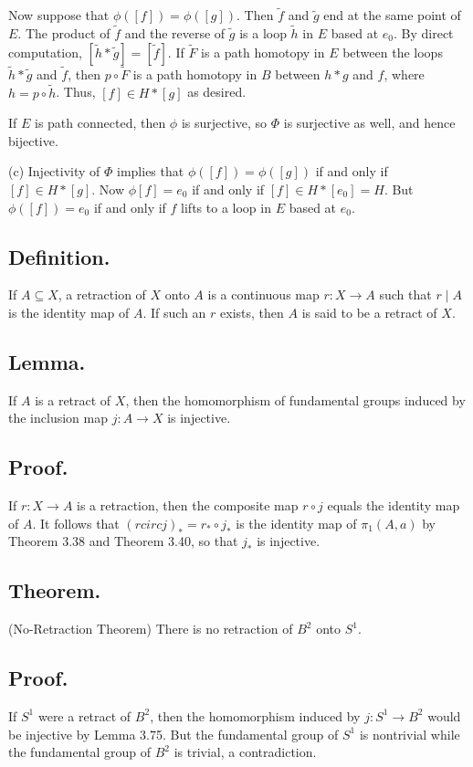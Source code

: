 \documentclass[titlepage]{article}
\begin{document}
Now suppose that $\phi([f]) = \phi([g])$. Then $\tilde{f}$ and $\tilde{g}$ end at the same point of $E$. The product of $\tilde{f}$ and the reverse of $\tilde{g}$ is a loop $\tilde{h}$ in $E$ based at $e_{0}$. By direct computation, $[\tilde{h} * \tilde{g}] = [\tilde{f}]$. If $\tilde{F}$ is a path homotopy in $E$ between the loops $\tilde{h} * \tilde{g}$ and $\tilde{f}$, then $p \circ \tilde{F}$ is a path homotopy in $B$ between $h * g$ and $f$, where $h = p \circ \tilde{h}$. Thus, $[f] \in H * [g]$ as desired.

If $E$ is path connected, then $\phi$ is surjective, so $\Phi$ is surjective as well, and hence bijective.

(c) Injectivity of $\Phi$ implies that $\phi([f]) = \phi([g])$ if and only if $[f] \in H * [g]$. Now $\phi[f] = e_{0}$ if and only if $[f] \in H * [e_{0}] = H$. But $\phi([f]) = e_{0}$ if and only if $f$ lifts to a loop in $E$ based at $e_{0}$.

\subsection{Definition.} If $A \subseteq X$, a retraction of $X$ onto $A$ is a continuous map $r: X \to A$ such that $r \mid A$ is the identity map of $A$. If such an $r$ exists, then $A$ is said to be a retract of $X$.

\subsection{Lemma.} If $A$ is a retract of $X$, then the homomorphism of fundamental groups induced by the inclusion map $j: A \to X$ is injective.

\subsection{Proof.} If $r: X \to A$ is a retraction, then the composite map $r \circ j$ equals the identity map of $A$. It follows that $(r circ j)_{*} = r_{*} \circ j_{*}$ is the identity map of $\pi_{1}(A, a)$ by Theorem 3.38 and Theorem 3.40, so that $j_{*}$ is injective.

\subsection{Theorem.} (No-Retraction Theorem) There is no retraction of $B^{2}$ onto $S^{1}$.

\subsection{Proof.} If $S^{1}$ were a retract of $B^{2}$, then the homomorphism induced by $j: S^{1} \to B^{2}$ would be injective by Lemma 3.75. But the fundamental group of $S^{1}$ is nontrivial while the fundamental group of $B^{2}$ is trivial, a contradiction.
\end{document}
